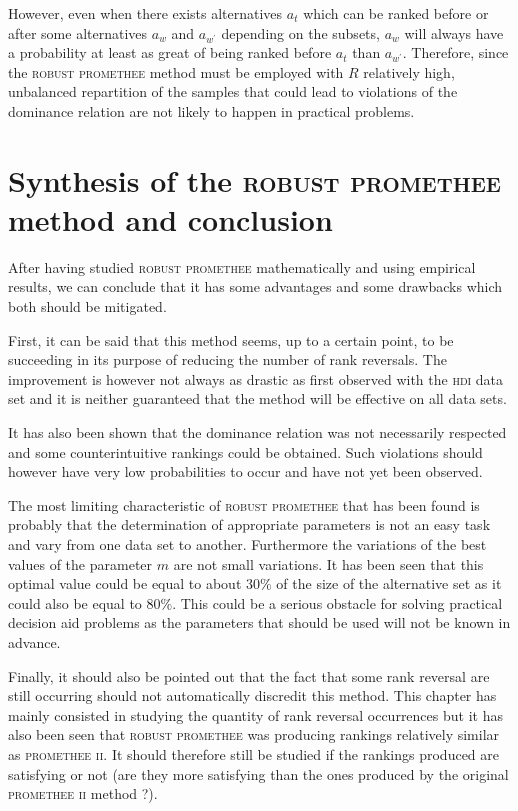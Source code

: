However, even when there exists alternatives $a_t$ which can be ranked before or after some alternatives $a_w$ and $a_{w^\prime}$ depending on the subsets, $a_w$ will always have a probability at least as great of being ranked before $a_t$ than $a_{w^\prime}$.
Therefore, since the \textsc{robust promethee} method must be employed with $R$ relatively high, unbalanced repartition of the samples that could lead to violations of the dominance relation are not likely to happen in practical problems.

\section{Synthesis of the \textsc{robust promethee} method and conclusion}

After having studied \textsc{robust promethee} mathematically and using empirical results, we can conclude that it has some advantages and some drawbacks which both should be mitigated.

First, it can be said that this method seems, up to a certain point, to be succeeding in its purpose of reducing the number of rank reversals.
The improvement is however not always as drastic as first observed with the \textsc{hdi} data set and it is neither guaranteed that the method will be effective on all data sets.

It has also been shown that the dominance relation was not necessarily respected and some counterintuitive rankings could be obtained. Such violations should however have very low probabilities to occur and have not yet been observed.

The most limiting characteristic of \textsc{robust promethee} that has been found is probably that the determination of appropriate parameters is not an easy task and vary from one data set to another.
Furthermore the variations of the best values of the parameter $m$ are not small variations. It has been seen that this optimal value could be equal to about $30\%$ of the size of the alternative set as it could also be equal to $80\%$.
This could be a serious obstacle for solving practical decision aid problems as the parameters that should be used will not be known in advance.

Finally, it should also be pointed out that the fact that some rank reversal are still occurring should not automatically discredit this method.
This chapter has mainly consisted in studying the quantity of rank reversal occurrences but it has also been seen that \textsc{robust promethee} was producing rankings relatively similar as \textsc{promethee ii}.
It should therefore still be studied if the rankings produced are satisfying or not (are they more satisfying than the ones produced by the original \textsc{promethee ii} method ?).


